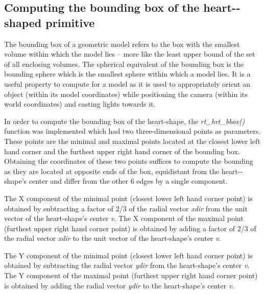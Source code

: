 \subsection{Computing the bounding box of the heart-­shaped primitive}

The   bounding   box   of   a   geometric   model   refers   to   the   box   with   the  
smallest   volume   within   which   the   model   lies   –   more   like   the   least   upper   bound  
of   the   set   of   all   enclosing   volumes.   The   spherical   equivalent   of   the   bounding  
box   is   the   bounding   sphere   which   is   the   smallest   sphere   within   which   a   model  
lies.   It   is   a   useful   property   to   compute   for   a   model   as   it   is   used   to   appropriately  
orient   an   object   (within   its   model   coordinates)   while   positioning   the   camera  
(within its world coordinates) and casting lights towards it.   

\hspace{30} In   order   to   compute   the   bounding   box   of   the   heart­-shape, the  
\textit{rt\_hrt\_bbox()} function was implemented which had two three­-dimensional points as  
parameters. These   points   are   the   minimal   and   maximal   points   located   at   the  
closest   lower   left   hand   corner   and   the   furthest   upper   right   hand   corner   of   the  
bounding   box.   Obtaining   the   coordinates   of   these   two   points   suffices   to  
compute   the   bounding   as   they   are   located   at   opposite   ends   of   the   box,  
equidistant   from   the   heart-­shape's   center   and   differ   from   the   other   6   edges   by  
a single  component.  

\hspace{30} The   X   component   of   the   minimal   point   (closest   lower   left   hand   corner  
point) is obtained by subtracting a factor of 2/3 of the radial vector \textit{xdir} from the unit vector of the  
heart-­shape's center \textit{v}.   The   X   component   of   the   maximal   point (furthest upper right hand corner point) is obtained   by   adding  a factor of 2/3 of the radial vector \textit{xdir} to the unit vector of the heart-­shape's center \textit{v}.

\hspace{30}The Y component of the minimal point (closest lower left hand corner point) is obtained by subtracting the radial vector \textit{ydir} from the heart-­shape's center  \textit{v}. The Y component of the maximal point (furthest upper right hand corner point) is obtained by adding the radial vector \textit{ydir} to the heart-­shape's center \textit{v}.    

